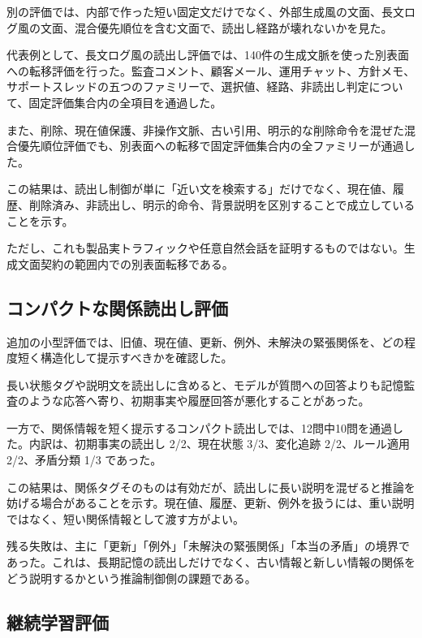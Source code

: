 \documentclass[12pt,a4paper]{article}
\begin{document}
別の評価では、内部で作った短い固定文だけでなく、外部生成風の文面、長文ログ風の文面、混合優先順位を含む文面で、読出し経路が壊れないかを見た。

代表例として、長文ログ風の読出し評価では、140件の生成文脈を使った別表面への転移評価を行った。監査コメント、顧客メール、運用チャット、方針メモ、サポートスレッドの五つのファミリーで、選択値、経路、非読出し判定について、固定評価集合内の全項目を通過した。

また、削除、現在値保護、非操作文脈、古い引用、明示的な削除命令を混ぜた混合優先順位評価でも、別表面への転移で固定評価集合内の全ファミリーが通過した。

この結果は、読出し制御が単に「近い文を検索する」だけでなく、現在値、履歴、削除済み、非読出し、明示的命令、背景説明を区別することで成立していることを示す。

ただし、これも製品実トラフィックや任意自然会話を証明するものではない。生成文面契約の範囲内での別表面転移である。

\subsection{コンパクトな関係読出し評価}\label{ux30b3ux30f3ux30d1ux30afux30c8ux306aux95a2ux4fc2ux8aadux51faux3057ux8a55ux4fa1}

追加の小型評価では、旧値、現在値、更新、例外、未解決の緊張関係を、どの程度短く構造化して提示すべきかを確認した。

長い状態タグや説明文を読出しに含めると、モデルが質問への回答よりも記憶監査のような応答へ寄り、初期事実や履歴回答が悪化することがあった。

一方で、関係情報を短く提示するコンパクト読出しでは、12問中10問を通過した。内訳は、初期事実の読出し 2/2、現在状態 3/3、変化追跡 2/2、ルール適用 2/2、矛盾分類 1/3 であった。

この結果は、関係タグそのものは有効だが、読出しに長い説明を混ぜると推論を妨げる場合があることを示す。現在値、履歴、更新、例外を扱うには、重い説明ではなく、短い関係情報として渡す方がよい。

残る失敗は、主に「更新」「例外」「未解決の緊張関係」「本当の矛盾」の境界であった。これは、長期記憶の読出しだけでなく、古い情報と新しい情報の関係をどう説明するかという推論制御側の課題である。

\subsection{継続学習評価}\label{ux7d99ux7d9aux5b66ux7fd2ux8a55ux4fa1}
\end{document}

